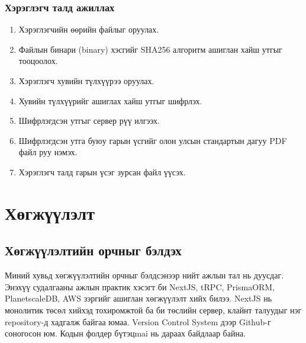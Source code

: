 \subsubsection{Хэрэглэгч талд ажиллах}
\begin{enumerate}
	\item Хэрэглэгчийн өөрийн файлыг оруулах.
	\item Файлын бинари (binary) хэсгийг SHA256 алгоритм ашиглан хайш утгыг тооцоолох.
	\item Хэрэглэгч хувийн түлхүүрээ оруулах.
	\item Хувийн түлхүүрийг ашиглах хайш утгыг шифрлэх.
	\item Шифрлэгдсэн утгыг сервер рүү илгээх.
	\item Шифрлэгдсэн утга буюу гарын үсгийг олон улсын стандартын дагуу PDF файл руу нэмэх.
	\item Хэрэглэгч талд гарын үсэг зурсан файл үүсэх.
\end{enumerate}

\section{Хөгжүүлэлт}

\subsection{Хөгжүүлэлтийн орчныг бэлдэх}
Миний хувьд хөгжүүлэлтийн орчныг бэлдсэнээр нийт ажлын тал нь дуусдаг. Энэхүү судалгааны ажлын практик хэсэгт би NextJS, tRPC, PrismaORM, PlanetscaleDB, AWS зэргийг ашиглан хөгжүүлэлт хийх билээ. NextJS нь монолитик төсөл хийхэд тохиромжтой ба би төслийн сервер, клайнт талуудыг нэг repository-д хадгалж байгаа юмаа. Version Control System дээр Github-г соногосон юм. Кодын фолдер бүтэцmai нь дараах байдлаар байна.

